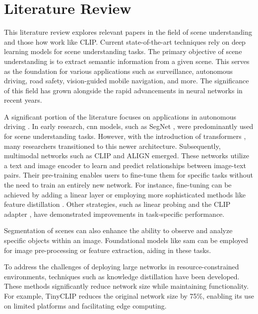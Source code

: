 \chapter{Literature Review}

This literature review explores relevant papers in the field of scene understanding and those how work like CLIP.  
Current state-of-the-art techniques rely on deep learning models for scene understanding tasks.  
The primary objective of scene understanding is to extract semantic information from a given scene.  
This serves as the foundation for various applications such as surveillance, autonomous driving, road safety, vision-guided mobile navigation, and more.  
The significance of this field has grown alongside the rapid advancements in neural networks in recent years.  

A significant portion of the literature focuses on applications in autonomous driving \cite{sceneunderstandingautdriving1}.  
In early research, \acrfull{cnn} models, such as SegNet \cite{SegNet}, were predominantly used for scene understanding tasks.  
However, with the introduction of transformers \cite{attentionisallyouneed}, many researchers transitioned to this newer architecture.  
Subsequently, multimodal networks such as CLIP \cite{clip} and ALIGN \cite{ALIGN} emerged.  
These networks utilize a text and image encoder to learn and predict relationships between image-text pairs.  
Their pre-training enables users to fine-tune them for specific tasks without the need to train an entirely new network.  
For instance, fine-tuning can be achieved by adding a linear layer or employing more sophisticated methods like feature distillation \cite{finetuneclip}.  
Other strategies, such as linear probing \cite{linearprobeclip} and the CLIP adapter \cite{clipadapter}, have demonstrated improvements in task-specific performance.  

Segmentation of scenes can also enhance the ability to observe and analyze specific objects within an image.  
Foundational models like \acrfull{sam} \cite{sam} can be employed for image pre-processing or feature extraction, aiding in these tasks.  

To address the challenges of deploying large networks in resource-constrained environments, techniques such as knowledge distillation have been developed.  
These methods significantly reduce network size while maintaining functionality.  
For example, TinyCLIP \cite{tinyclip} reduces the original network size by 75\%, enabling its use on limited platforms and facilitating edge computing.  
